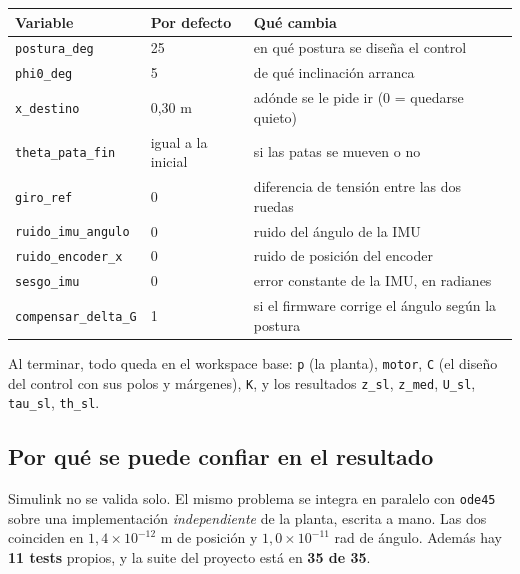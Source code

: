 \documentclass[11pt,a4paper]{article}
\begin{document}
\begin{center}
\small
\begin{tabular}{@{}llp{7.6cm}@{}}
\toprule
\textbf{Variable} & \textbf{Por defecto} & \textbf{Qué cambia} \\
\midrule
\texttt{postura\_deg} & 25 & en qué postura se diseña el control \\
\texttt{phi0\_deg} & 5 & de qué inclinación arranca \\
\texttt{x\_destino} & 0,30 m & adónde se le pide ir (0 = quedarse quieto) \\
\texttt{theta\_pata\_fin} & igual a la inicial & si las patas se mueven o no \\
\texttt{giro\_ref} & 0 & diferencia de tensión entre las dos ruedas \\
\texttt{ruido\_imu\_angulo} & 0 & ruido del ángulo de la IMU \\
\texttt{ruido\_encoder\_x} & 0 & ruido de posición del encoder \\
\texttt{sesgo\_imu} & 0 & error constante de la IMU, en radianes \\
\texttt{compensar\_delta\_G} & 1 & si el firmware corrige el ángulo según la postura \\
\bottomrule
\end{tabular}
\end{center}

Al terminar, todo queda en el workspace base: \texttt{p} (la planta), \texttt{motor}, \texttt{C}
(el diseño del control con sus polos y márgenes), \texttt{K}, y los resultados
\texttt{z\_sl}, \texttt{z\_med}, \texttt{U\_sl}, \texttt{tau\_sl}, \texttt{th\_sl}.

\subsection*{Por qué se puede confiar en el resultado}

Simulink no se valida solo. El mismo problema se integra en paralelo con \texttt{ode45} sobre una
implementación \emph{independiente} de la planta, escrita a mano. Las dos coinciden en
$1{,}4\times10^{-12}$ m de posición y $1{,}0\times10^{-11}$ rad de ángulo. Además hay
\textbf{11 tests} propios, y la suite del proyecto está en \textbf{35 de 35}.
\end{document}
